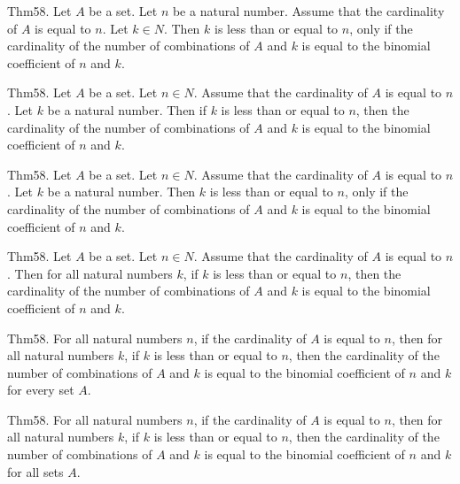 \documentclass{article}
\begin{document}
Thm58. Let $A$ be a set. Let $n$ be a natural number. Assume that the cardinality of $A$ is equal to $n$. Let $k \in N$. Then $k$ is less than or equal to $n$, only if the cardinality of the number of combinations of $A$ and $k$ is equal to the binomial coefficient of $n$ and $k$.

Thm58. Let $A$ be a set. Let $n \in N$. Assume that the cardinality of $A$ is equal to $n$. Let $k$ be a natural number. Then if $k$ is less than or equal to $n$, then the cardinality of the number of combinations of $A$ and $k$ is equal to the binomial coefficient of $n$ and $k$.

Thm58. Let $A$ be a set. Let $n \in N$. Assume that the cardinality of $A$ is equal to $n$. Let $k$ be a natural number. Then $k$ is less than or equal to $n$, only if the cardinality of the number of combinations of $A$ and $k$ is equal to the binomial coefficient of $n$ and $k$.

Thm58. Let $A$ be a set. Let $n \in N$. Assume that the cardinality of $A$ is equal to $n$. Then for all natural numbers $k$, if $k$ is less than or equal to $n$, then the cardinality of the number of combinations of $A$ and $k$ is equal to the binomial coefficient of $n$ and $k$.

Thm58. For all natural numbers $n$, if the cardinality of $A$ is equal to $n$, then for all natural numbers $k$, if $k$ is less than or equal to $n$, then the cardinality of the number of combinations of $A$ and $k$ is equal to the binomial coefficient of $n$ and $k$ for every set $A$.

Thm58. For all natural numbers $n$, if the cardinality of $A$ is equal to $n$, then for all natural numbers $k$, if $k$ is less than or equal to $n$, then the cardinality of the number of combinations of $A$ and $k$ is equal to the binomial coefficient of $n$ and $k$ for all sets $A$.
\end{document}
